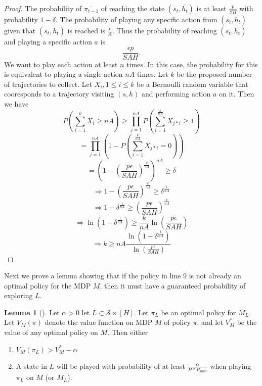 \documentclass[12pt, letterpaper]{article}
\theoremstyle{definition}
\newtheorem*{lemma}{Lemma}
\theoremstyle{remark}
\begin{document}
\begin{proof}[Proof]
    The probability of \(\overline{\pi_{t-1}}\) of reaching the state \((\overline{s_t}, \overline{h_t})\) is at least \(\frac{p}{SH}\) with probability \(1 - \delta\). The probability of playing any specific action from \((\overline{s_t}, \overline{h_t})\) given that \((\overline{s_t}, \overline{h_t})\) is reached is \(\frac{\epsilon}{A}\). Thus the probability of reaching \((\overline{s_t}, \overline{h_t})\) and playing a specific action \(a\) is
    \[\frac{\epsilon p}{SAH}.\]
    We want to play each action at least \(n\) times. In this case, the probability for this is equivalent to playing a single action \(nA\) times. Let \(k\) be the proposed number of trajectories to collect. Let \(X_i, 1 \leq i \leq k\) be a Bernoulli random variable that cooresponds to a trajectory visiting \((s, h)\) and performing action \(a\) on it. Then we have
    \[P(\sum_{i=1}^{k}X_i \geq nA ) \geq \prod_{j=1}^{nA} P(\sum_{i=1}^{\frac{k}{nA}} X_{j*i} \geq 1)\]
    \[= \prod_{j=1}^{nA} (1 - P(\sum_{i=1}^{\frac{k}{nA}}X_{j*i} = 0))\]
    \[= (1 - (\frac{p\epsilon}{SAH})^{\frac{k}{nA}})^{nA} \geq \delta\]
    \[\Rightarrow 1 - (\frac{p\epsilon}{SAH})^{\frac{k}{nA}} \geq \delta^{\frac{1}{nA}}\]
    \[\Rightarrow 1 - \delta^{\frac{1}{nA}} \geq (\frac{p\epsilon}{SAH})^{\frac{k}{nA}}\]
    \[\Rightarrow \ln(1 - \delta^{\frac{1}{nA}}) \geq \frac{k}{nA} \ln(\frac{p\epsilon}{SAH})\]
    \[\Rightarrow k \geq nA \frac{\ln(1 - \delta^{\frac{1}{nA}})}{\ln(\frac{p\epsilon}{SAH})}\]
\end{proof}


Next we prove a lemma showing that if the policy in line 9 is not already an optimal policy for the MDP \(M\), then it must have a guaranteed probability of exploring \(L\).

\begin{lemma}[]
    Let \(\alpha > 0\) let \(L \subset \mathcal{S} \times [H]\). Let \(\pi_L\) be an optimal policy for \(M_L\). Let \(V_{M}(\pi)\) denote the value function on MDP \(M\) of policy \(\pi\), and let \(V^*_{M}\) be the value of any optimal policy on \(M\). Then either

    \begin{enumerate}
        \item \(V_{M} (\pi_L) > V^*_{M} - \alpha\)
        \item A state in \(L\) will be played with probability of at least \(\frac{\alpha}{H*R_{max}}\) when playing \(\pi_L\) on \(M\) (or \(M_L\)).
    \end{enumerate}
    
\end{lemma}
\end{document}
